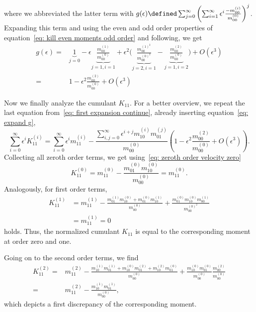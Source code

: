 where we abbreviated the latter term with $g(\epsilon) \defined \sum_{j=0}^\infty {\left(\sum_{i=1}^\infty \epsilon^i \frac{ - m_{00}^{(i)}}{ m_{00}^{(0)}}\right)}^j$.
Expanding this term and using the even and odd order properties of equation~\eqref{eq: kill even moments odd order} and following, we get
\begin{equation}
  \label{eq: expand g}
  \begin{aligned}
    g(\epsilon) = & \underbrace{1}_{j=0} - \epsilon \underbrace{ \frac{m_{00}^{(1)}}{m_{00}^{(0)}}}_{j=1,i=1}
    + \epsilon^2 \Bigg(
      \underbrace{\frac{m_{00}^{{(1)}^2}}{m_{00}^{{(0)}^2}}}_{j=2,i=1}
      - \underbrace{\frac{m_{00}^{(2)}}{m_{00}^{(0)}}}_{j=1,i=2} \Bigg) + O(\epsilon^3)
      \\=&
      1 - \epsilon^2 \frac{m_{00}^{(2)}}{m_{00}^{(0)}}  + O(\epsilon^3)
  \end{aligned}
\end{equation}

Now we finally analyze the cumulant $K_{11}$.
For a better overview, we repeat the last equation from~\eqref{eq: first expansion continue}, already inserting equation~\eqref{eq: expand g},
\begin{equation}
  \sum_{i=0}^\infty \epsilon^i K_{11}^{(i)}
   = \sum_{i=0}^\infty \epsilon^i m_{11}^{(i)} -
  \frac{\sum_{i,j=0}^\infty \epsilon^{i+j} m_{10}^{(i)}m_{01}^{(j)}}
      {m_{00}^{(0)}}
  \left(1 - \epsilon^2 \frac{m_{00}^{(2)}}{m_{00}^{(0)}}  + O(\epsilon^3)\right).
\end{equation}
Collecting all zeroth order terms, we get using~\eqref{eq: zeroth order velocity zero}
\begin{equation}
  K_{11}^{(0)} = m_{11}^{(0)} - \frac{m_{01}^{(0)}m_{10}^{(0)}}{m_{00}^{(0)}} =  m_{11}^{(0)}.
\end{equation}
Analogously, for first order terms,
\begin{equation}
  \begin{aligned}
    K_{11}^{(1)} & = m_{11}^{(1)} - \frac{m_{01}^{(1)}m_{10}^{(0)}+m_{01}^{(0)}m_{10}^{(1)}}{m_{00}^{(0)}}
    +\frac{m_{01}^{(0)}m_{10}^{(0)}m_{00}^{(1)}}{m_{00}^{{(0)}^2}}  \\
    &= m_{11}^{(1)} = 0
  \end{aligned}
\end{equation}
holds.
Thus, the normalized cumulant $K_{11}$ is equal to the corresponding moment at order zero and one.

Going on to the second order terms, we find
\begin{equation}
  \begin{aligned}
    K_{11}^{(2)}
    = &m_{11}^{(2)}
    - \frac{
      m_{10}^{(1)}m_{01}^{(1)}
    + m_{10}^{(0)}m_{01}^{(2)}
    + m_{10}^{(2)}m_{01}^{(0)}
    }{m_{00}^{(0)}}
    + \frac{m_{10}^{(0)}m_{01}^{(0)}}{m_{00}^{(0)}}
    \frac{m_{00}^{(2)}}{{m_{00}^{(0)}}}
    \\ = &
    m_{11}^{(2)}
    - \frac{ m_{10}^{(1)}m_{01}^{(1)}}{m_{00}^{(0)}},
  \end{aligned}
\end{equation}
which depicts a first discrepancy of the corresponding moment.

